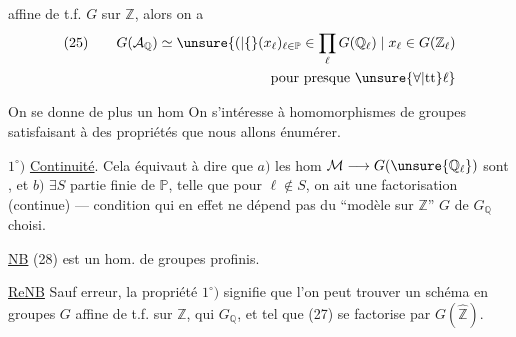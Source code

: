 
affine de t.f. \(G\) sur \(\mathbb{Z}\), alors on a
\[
\begin{gathered}
(25)\qquad G(\mathcal{A}_{\mathbb{Q}})\simeq
\unsure{(|\{}(x_{\ell})_{\ell\in\mathbb{P}}\in\prod_{\ell}G(\mathbb{Q}_{\ell})
\mid x_{\ell}\in G(\mathbb{Z}_{\ell})\\
\hfill\text{pour presque }\unsure{\forall|\mathrm{tt}}\ell\}
\end{gathered}
\]


On se donne de plus un hom
On s'intéresse à  homomorphismes de groupes
satisfaisant à des propriétés que nous allons énumérer.

\(1^\circ)\) \uline{Continuité}. Cela équivaut à dire que \(a)\) les hom \(\mathcal{M}\longrightarrow G(\unsure{\mathbb{Q}_{\ell}})\) sont , et \(b)\) \(\exists S\) partie finie de \(\mathbb{P}\), telle que pour \(\ell\notin S\), on ait  une factorisation (continue)
--- condition qui en effet ne dépend pas du ``modèle sur \(\mathbb{Z}\)'' \(G\) de \(G_{\mathbb{Q}}\) choisi.

\uline{NB} (28) est un hom. de groupes profinis.


\uline{ReNB} Sauf erreur, la propriété \(1^\circ)\) signifie que l'on peut trouver un schéma en groupes \(G\) affine de t.f. sur \(\mathbb{Z}\), qui  \(G_{\mathbb{Q}}\), et tel que (27) se factorise par \(G(\widehat{\mathbb{Z}})\).

